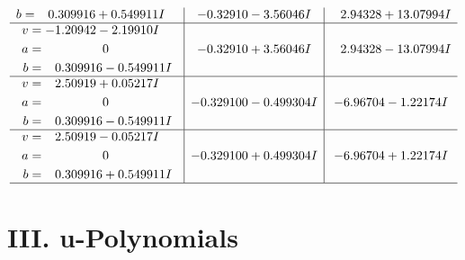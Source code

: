 \documentclass[1p]{elsarticle_modified}
\theoremstyle{definition}
\begin{document}
$$\begin{array}{c|c|c}
\begin{aligned}
b &= \phantom{-}0.309916 + 0.549911 I\end{aligned}
 & -0.32910 - 3.56046 I & \phantom{-}2.94328 + 13.07994 I \\ \hline\begin{aligned}
v &= -1.20942 - 2.19910 I \\
a &= \phantom{-0.000000 } 0 \\
b &= \phantom{-}0.309916 - 0.549911 I\end{aligned}
 & -0.32910 + 3.56046 I & \phantom{-}2.94328 - 13.07994 I \\ \hline\begin{aligned}
v &= \phantom{-}2.50919 + 0.05217 I \\
a &= \phantom{-0.000000 } 0 \\
b &= \phantom{-}0.309916 - 0.549911 I\end{aligned}
 & -0.329100 - 0.499304 I & -6.96704 - 1.22174 I \\ \hline\begin{aligned}
v &= \phantom{-}2.50919 - 0.05217 I \\
a &= \phantom{-0.000000 } 0 \\
b &= \phantom{-}0.309916 + 0.549911 I\end{aligned}
 & -0.329100 + 0.499304 I & -6.96704 + 1.22174 I\\
 \hline 
 \end{array}$$\newpage
\newpage\renewcommand{\arraystretch}{1}
\centering \section*{ III. u-Polynomials}
\end{document}
